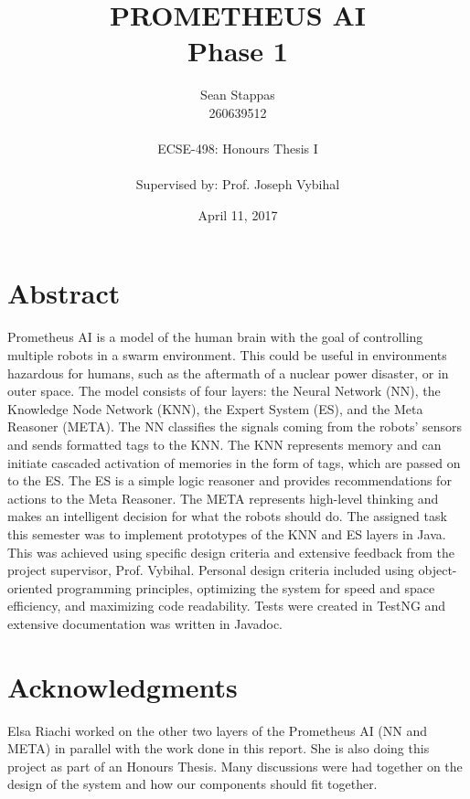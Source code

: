 \documentclass[titlepage,11pt]{article}
\title
{
	\uppercase{Prometheus AI} \\
	\large Phase 1
}
\author %
{
	Sean Stappas \\ 
	260639512 \\
	\\ 
	ECSE-498: Honours Thesis I \\
	\\
	\small Supervised by: Prof. Joseph Vybihal
}
\date{April 11, 2017}
\begin{document}
	
\sloppy

\maketitle

\section*{Abstract}
Prometheus AI is a model of the human brain with the goal of controlling multiple robots in a swarm environment. This could be useful in environments hazardous for humans, such as the aftermath of a nuclear power disaster, or in outer space. The model consists of four layers: the Neural Network (NN), the Knowledge Node Network (KNN), the Expert System (ES), and the Meta Reasoner (META). The NN classifies the signals coming from the robots' sensors and sends formatted tags to the KNN. The KNN represents memory and can initiate cascaded activation of memories in the form of tags, which are passed on to the ES. The ES is a simple logic reasoner and provides recommendations for actions to the Meta Reasoner. The META represents high-level thinking and makes an intelligent decision for what the robots should do. The assigned task this semester was to implement prototypes of the KNN and ES layers in Java. This was achieved using specific design criteria and extensive feedback from the project supervisor, Prof. Vybihal. Personal design criteria included using object-oriented programming principles, optimizing the system for speed and space efficiency, and maximizing code readability. Tests were created in TestNG and extensive documentation was written in Javadoc.

\section*{Acknowledgments}
Elsa Riachi worked on the other two layers of the Prometheus AI (NN and META) in parallel with the work done in this report. She is also doing this project as part of an Honours Thesis. Many discussions were had together on the design of the system and how our components should fit together.
\end{document}
